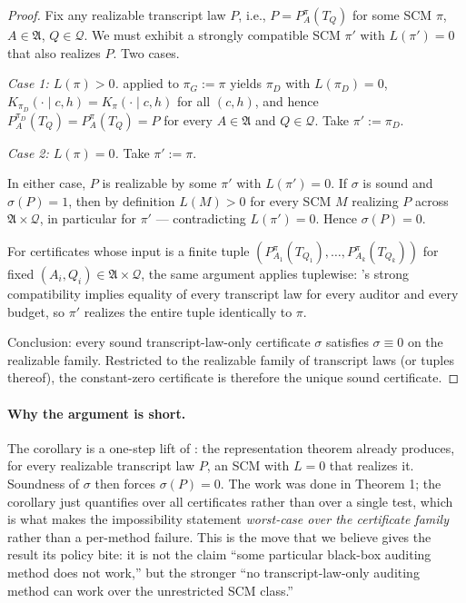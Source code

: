 \documentclass{article}
\theoremstyle{plain}
\theoremstyle{definition}
\theoremstyle{remark}
\begin{document}
\begin{proof}
Fix any realizable transcript law $P$, i.e., $P = P_A^{\pi}(T_Q)$ for some
SCM $\pi$, $A \in \mathfrak A$, $Q \in \mathcal Q$. We must exhibit a strongly
compatible SCM $\pi'$ with $L(\pi') = 0$ that also realizes $P$. Two cases.

\emph{Case 1: $L(\pi) > 0$.}  applied to $\pi_G := \pi$
yields $\pi_D$ with $L(\pi_D) = 0$, $K_{\pi_D}(\cdot \mid c, h) = K_\pi(\cdot \mid c, h)$
for all $(c, h)$, and hence $P_A^{\pi_D}(T_Q) = P_A^\pi(T_Q) = P$ for every
$A \in \mathfrak A$ and $Q \in \mathcal Q$. Take $\pi' := \pi_D$.

\emph{Case 2: $L(\pi) = 0$.} Take $\pi' := \pi$.

In either case, $P$ is realizable by some $\pi'$ with $L(\pi') = 0$.
If $\sigma$ is sound and $\sigma(P) = 1$, then by definition $L(M) > 0$
for every SCM $M$ realizing $P$ across $\mathfrak{A} \times \mathcal Q$, in
particular for $\pi'$ --- contradicting $L(\pi') = 0$. Hence $\sigma(P) = 0$.

For certificates whose input is a finite tuple
$(P_{A_1}^\pi(T_{Q_1}), \ldots, P_{A_k}^\pi(T_{Q_k}))$ for fixed
$(A_i, Q_i) \in \mathfrak A \times \mathcal Q$, the same argument applies
tuplewise: 's strong compatibility implies
equality of every transcript law for every auditor and every budget, so
$\pi'$ realizes the entire tuple identically to $\pi$.

Conclusion: every sound transcript-law-only certificate $\sigma$ satisfies
$\sigma \equiv 0$ on the realizable family. Restricted to the realizable
family of transcript laws (or tuples thereof), the constant-zero
certificate is therefore the unique sound certificate.
\end{proof}

\paragraph{Why the argument is short.}
The corollary is a one-step lift of : the
representation theorem already produces, for every realizable transcript law
$P$, an SCM with $L = 0$ that realizes it. Soundness of $\sigma$ then forces
$\sigma(P) = 0$. The work was done in Theorem 1; the corollary just
quantifies over all certificates rather than over a single test, which is
what makes the impossibility statement \emph{worst-case over the certificate
family} rather than a per-method failure. This is the move that we believe
gives the result its policy bite: it is not the claim ``some particular
black-box auditing method does not work,'' but the stronger ``no
transcript-law-only auditing method can work over the unrestricted SCM
class.''
\end{document}
